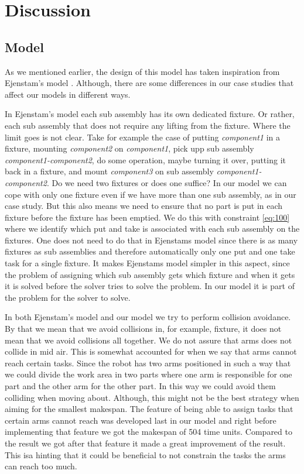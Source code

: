\chapter{Discussion}\label{cha:discuss}

\section{Model}
As we mentioned earlier, the design of this model has taken inspiration from Ejenstam's model \cite{ejenstam_2014}. Although, there are some differences in our case studies that affect our models in different ways.

In Ejenstam's model each sub assembly has its own dedicated fixture. Or rather, each sub assembly that does not require any lifting from the fixture. Where the limit goes is not clear. Take for example the case of putting \emph{component1} in a fixture, mounting \emph{component2} on \emph{component1}, pick upp sub assembly \emph{component1-component2}, do some operation, maybe turning it over, putting it back in a fixture, and mount \emph{component3} on sub assembly \emph{component1-component2}. Do we need two fixtures or does one suffice? In our model we can cope with only one fixture even if we have more than one sub assembly, as in our case study. But this also means we need to ensure that no part is put in each fixture before the fixture has been emptied. We do this with constraint \ref{eq:100} where we identify which put and take is associated with each sub assembly on the fixtures. One does not need to do that in Ejenstams model since there is as many fixtures as sub assemblies and therefore automatically only one put and one take task for a single fixture. It makes Ejenstams model simpler in this aspect, since the problem of assigning which sub assembly gets which fixture and when it gets it is solved before the solver tries to solve the problem. In our model it is part of the problem for the solver to solve.

In both Ejenstam's model and our model we try to perform collision avoidance. By that we mean that we avoid collisions in, for example, fixture, it does not mean that we avoid collisions all together. We do not assure that arms does not collide in mid air. This is somewhat accounted for when we say that arms cannot reach certain tasks. Since the robot has two arms positioned in such a way that we could divide the work area in two parts where one arm is responsible for one part and the other arm for the other part. In this way we could avoid them colliding when moving about. Although, this might not be the best strategy when aiming for the smallest makespan. The feature of being able to assign tasks that certain arms cannot reach was developed last in our model and right before implementing that feature we got the makespan of 504 time units. Compared to the result we got after that feature it made a great improvement of the result. This isa hinting that it could be beneficial to not constrain the tasks the arms can reach too much.

